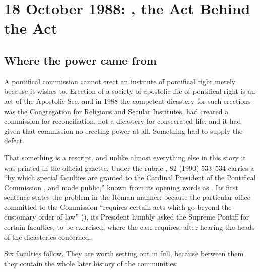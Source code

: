 \section{18 October 1988: , the Act Behind the Act}

\subsection{Where the power came from}

A pontifical commission cannot erect an institute of pontifical right
merely because it wishes to. Erection of a society of apostolic life of
pontifical right is an act of the Apostolic See, and in 1988 the
competent dicastery for such erections was the Congregation for
Religious and Secular Institutes.  had created a
commission for reconciliation, not a dicastery for consecrated life, and
it had given that commission no erecting power at all. Something had to
supply the defect.

That something is a rescript, and unlike almost everything else in this
story it was printed in the official gazette. Under the rubric
,  82 (1990)
533--534 carries a  ``by which
special faculties are granted to the Cardinal President of the Pontifical
Commission , and made public,'' known from its
opening words as . Its first sentence states
the problem in the Roman manner: because the particular office committed
to the Commission ``requires certain acts which go beyond the customary
order of law'' (), its
President humbly asked the Supreme Pontiff for certain faculties, to be
exercised, where the case requires, after hearing the heads of the
dicasteries concerned.

Six faculties follow. They are worth setting out in full, because between
them they contain the whole later history of the 
communities:

